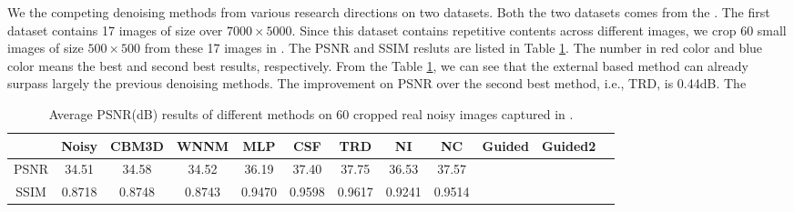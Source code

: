 \documentclass[10pt,twocolumn,letterpaper]{article}
\begin{document}
We the competing denoising methods from various research directions on two datasets. Both the two datasets comes from the \cite{crosschannel2016}. The first dataset contains 17 images of size over $7000\times5000$. Since this dataset contains repetitive contents across different images, we crop 60 small images of size $500\times500$ from these 17 images in \cite{crosschannel2016}. The PSNR and SSIM resluts are listed in Table \ref{tab1}. The number in red color and blue color means the best and second best results, respectively. From the Table \ref{tab1}, we can see that the external based method can already surpass largely the previous denoising methods. The improvement on PSNR over the second best method, i.e., TRD, is 0.44dB. The 
\begin{table}\label{tab1}
\caption{Average PSNR(dB) results of different methods on 60 cropped real noisy images captured in \cite{crosschannel2016}.}
\label{tab1}
\begin{center}
\renewcommand\arraystretch{1}
\begin{tabular}{|c||c|c|c|c|c|c|c|c|c|c|c|}
\hline
 & \textbf{Noisy} &\textbf{CBM3D}&\textbf{WNNM}&\textbf{MLP}&\textbf{CSF}&\textbf{TRD}& \textbf{NI}& \textbf{NC} &\textbf{Guided}  &\textbf{Guided2} 
\\
\hline
PSNR & 34.51 & 34.58 & 34.52 & 36.19 & 37.40 & 37.75 & 36.53 & 37.57 &  \color{blue}{38.72} & \color{red}{ 38.90}
\\
\hline
SSIM & 0.8718  & 0.8748  & 0.8743   & 0.9470 & 0.9598 &  0.9617 & 0.9241  &  0.9514  & \color{blue}{0.9694} & \color{red}{0.9702}
\\
\hline
\end{tabular}
\end{center}
\end{table}
\end{document}

